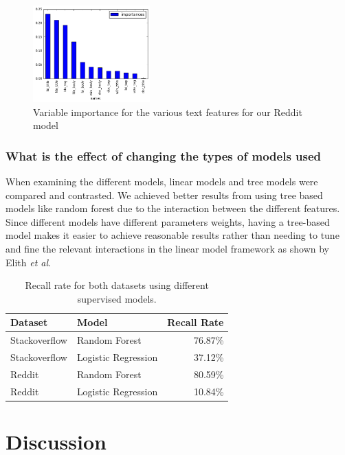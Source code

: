 \documentclass[journal]{IEEEtran}
\begin{document}
\begin{figure}[ht]
\centering
\caption{Variable importance for the various text features for our Reddit model}
\includegraphics[width=0.4\textwidth]{reddit_varimp.png}
\end{figure}



\subsubsection{What is the effect of changing the types of models used}

When examining the different models, linear models and tree models were compared and contrasted. We achieved better results from using tree based models like random forest due to the interaction between the different features. Since different models have different parameters weights, having a tree-based model makes it easier to achieve reasonable results rather than needing to tune and fine the relevant interactions in the linear model framework as shown by Elith \emph{et al}\cite{gbminteraction}. 

\begin{table}[h!]
\centering
\caption{Recall rate for both datasets using different supervised models.}
 \begin{tabular}{l l r} 
 \hline
 Dataset & Model & Recall Rate  \\ 
 \hline
 Stackoverflow & Random Forest & 76.87\%  \\
 Stackoverflow & Logistic Regression & 37.12\%  \\
   Reddit & Random Forest & 80.59\%  \\
  Reddit & Logistic Regression & 10.84\%  \\
 \hline
\end{tabular}
\end{table}

\section{Discussion}
\end{document}
